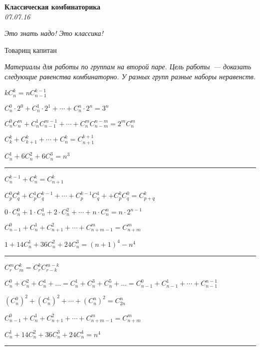 \begin{center}
\textbf{\Large Классическая комбинаторика}\\
\textit{07.07.16}
\end{center}

\epigraph{\it Это знать надо! Это классика!}{Товарищ капитан}

\textit{Материалы для работы по группам на второй паре. Цель работы~--- доказать следующие равенства комбинаторно. У разных групп разные наборы неравенств.}

\begin{problems}
\item $kC_n^k=nC_{n-1}^{k-1}$

\item $C_n^0\cdot 2^0+C_n^1\cdot 2^1+\cdots+C_n^n\cdot 2^n=3^n$

\item $C_n^0 C_n^m + C_n^1 C_{n-1}^{m-1} + \cdots + C_n^m C_{n-m}^{n-m}=2^m C_n^m$

\item $C_k^k+C_{k+1}^k+\cdots+C_n^k=C_{n+1}^{k+1}$

\item $C^1_n + 6C^2_n + 6C^3_n = n^3$
\end{problems}
\resetproblem
\vspace{5pt}
\hrule
\begin{problems}
\item $C_n^{k-1}+C_n^{k}=C_{n+1}^k$

\item $C_p^0 C_q^k + C_p^1 C_q^{k-1}+\cdots +C_p^{k-1} C_q^1 ++C_p^k C_q^0=C_{p+q}^k$

\item $0\cdot C_n^0 + 1\cdot C_n^1 + 2\cdot C_n^2+\cdots+n\cdot C_n^n=n\cdot 2^{n-1}$

\item $C_{n-1}^0+C_n^1+C_{n+1}^2+\cdots+C_{n+m-1}^m=C_{n+m}^m$

\item $1 + 14C^1_n + 36C^2_n + 24C^3_n = (n + 1)^4 - n^4$
\end{problems}
\resetproblem
\vspace{5pt}
\hrule
\begin{problems}
\item $C_r^m C_m^k=C_r^k C_{r-k}^{m-k}$

\item $C_n^0+C_n^2+C_n^4+\dots=C_n^1+C_n^3+C_n^5+\dots=C_{n-1}^0+C_{n-1}^1+\cdots+C_{n-1}^{n-1}$

\item $(C_n^0)^2 + (C_n^{1})^2+\cdots+(C_n^n)^2=C_{2n}^n$

\item $C_{n-1}^0+C_n^1+C_{n+1}^2+\cdots+C_{n+m-1}^m=C_{n+m}^m$

\item $C^1_n + 14C^2_n + 36C^3_n + 24C^4_n = n^4$
\end{problems}
\resetproblem
\vspace{5pt}
\hrule

